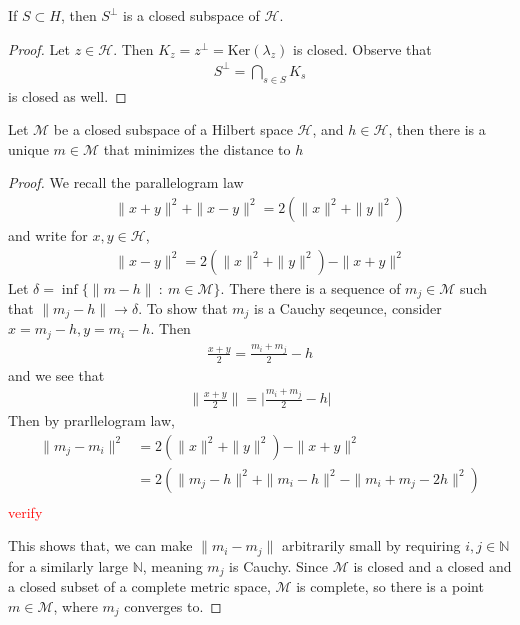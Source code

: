 \begin{theorem}
  If $S \subset H$, then $S^\perp$ is a closed subspace of $\mathcal{H}$.
\end{theorem}
\begin{proof}
  Let $z \in \mathcal{H}$. Then $K_z = z^\perp =
  \textrm{Ker}(\lambda_z)$ is closed. Observe that
  \begin{align*}
    S^\perp = \bigcap_{s \in S}K_s
  \end{align*}
  is closed as well.
\end{proof}

\begin{lemma}
  Let $\mathcal{M}$ be a closed subspace of a Hilbert space
  $\mathcal{H}$, and $h \in \mathcal{H}$, then there is a unique $m
  \in \mathcal{M}$ that minimizes the distance to $h$
\end{lemma}
\begin{proof}
  We recall the parallelogram law
  \begin{align*}
    \|x + y\|^2 + \|x -y\|^2 = 2 ( \|x\|^2 + \|y\|^2)
  \end{align*}
  and write for $x, y \in \mathcal{H}$,
  \begin{align*}
    \|x - y\|^2 = 2 (\|x\|^2 + \|y\|^2) - \|x + y\|^2
  \end{align*}
  Let $\delta = \inf \{ \|m - h\|  \ : \  m \in \mathcal{M}  \}$.
  There there is a sequence of $m_j \in \mathcal{M}$ such that $\|m_j
  - h\| \to \delta$. To show that $m_j$ is a Cauchy seqeunce,
  consider $x = m_j -h, y = m_i - h$. Then
  \begin{align*}
    \frac{x+y}{2} = \frac{m_i + m_j}{2} - h
  \end{align*}
  and we see that
  \begin{align*}
    \Big\|\frac{x+y}{2}\Big\| = \Big|\frac{m_i+m_j}{2} - h\Big|
  \end{align*}
  Then by prarllelogram law,
  \begin{align*}
    \|m_j - m_i\|^2 &= 2(\|x\|^2 + \|y\|^2) - \|x + y\|^2 \\
    &=2(\|m_j - h\|^2 + \|m_i - h\|^2 - \|m_i + m_j - 2h\|^2) \\
  \end{align*}
  \textcolor{red}{verify}

  This shows that, we can make $\|m_i - m_j\|$ arbitrarily small by
  requiring $ i, j \in \mathbb{N}$ for a similarly large
  $\mathbb{N}$, meaning $ m_j $ is Cauchy. Since $ \mathcal{M}$ is
  closed and a closed and a closed subset of a complete metric space,
  $\mathcal{M}$ is complete, so there is a point $m \in \mathcal{M}$,
  where $m_j$ converges to.
\end{proof}


